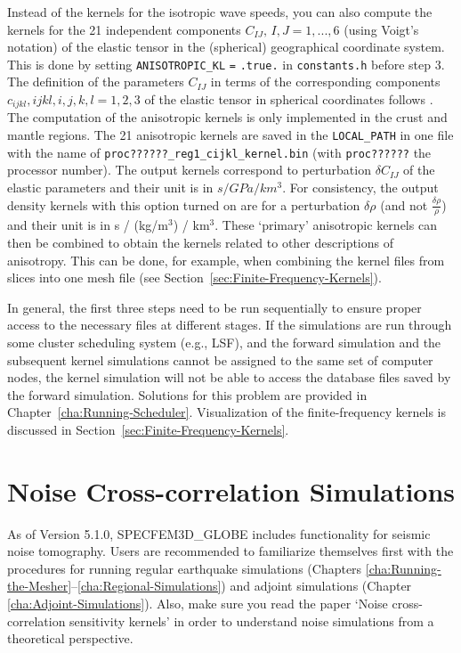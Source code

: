 \documentclass[oneside,english]{book}
\begin{document}
\begin{enumerate}
Instead of the kernels for the isotropic wave speeds, you can also
compute the kernels for the 21 independent components $C_{IJ},\, I,J=1,...,6$
(using Voigt's notation) of the elastic tensor in the (spherical)
geographical coordinate system. This is done by setting \texttt{ANISOTROPIC\_KL}
\texttt{=} \texttt{.true.} in \texttt{constants.h} before step 3.
The definition of the parameters $C_{IJ}$ in terms of the corresponding
components $c_{ijkl},ijkl,i,j,k,l=1,2,3$ of the elastic tensor in
spherical coordinates follows \citet{ChTr07}. The computation of
the anisotropic kernels is only implemented in the crust and mantle
regions. The 21 anisotropic kernels are saved in the \texttt{LOCAL\_PATH}
in one file with the name of \texttt{proc??????\_reg1\_cijkl\_kernel.bin}
(with \texttt{proc??????} the processor number). The output kernels
correspond to perturbation $\delta C_{IJ}$ of the elastic parameters
and their unit is in $s/GPa/km^{3}$. For consistency, the output
density kernels with this option turned on are for a perturbation
$\delta\rho$ (and not $\frac{\delta\rho}{\rho}$) and their unit
is in s / (kg/m$^{3}$) / km$^{3}$. These `primary' anisotropic kernels
can then be combined to obtain the kernels related to other descriptions
of anisotropy. This can be done, for example, when combining the kernel
files from slices into one mesh file (see Section~\ref{sec:Finite-Frequency-Kernels}).

\end{enumerate}
In general, the first three steps need to be run sequentially to ensure
proper access to the necessary files at different stages. If the simulations
are run through some cluster scheduling system (e.g., LSF), and the
forward simulation and the subsequent kernel simulations cannot be
assigned to the same set of computer nodes, the kernel simulation
will not be able to access the database files saved by the forward
simulation. Solutions for this problem are provided in Chapter~\ref{cha:Running-Scheduler}.
Visualization of the finite-frequency kernels is discussed in Section~\ref{sec:Finite-Frequency-Kernels}.


\chapter{Noise Cross-correlation Simulations}

As of Version 5.1.0, SPECFEM3D\_GLOBE includes functionality for seismic noise tomography.
Users are recommended to familiarize themselves first with the procedures for running regular earthquake
simulations (Chapters \ref{cha:Running-the-Mesher}--\ref{cha:Regional-Simulations}) and
adjoint simulations (Chapter \ref{cha:Adjoint-Simulations}).
Also, make sure you read the paper `Noise cross-correlation sensitivity kernels' \citep{trompetal2010}
in order to understand noise simulations from a theoretical perspective.
\end{document}
